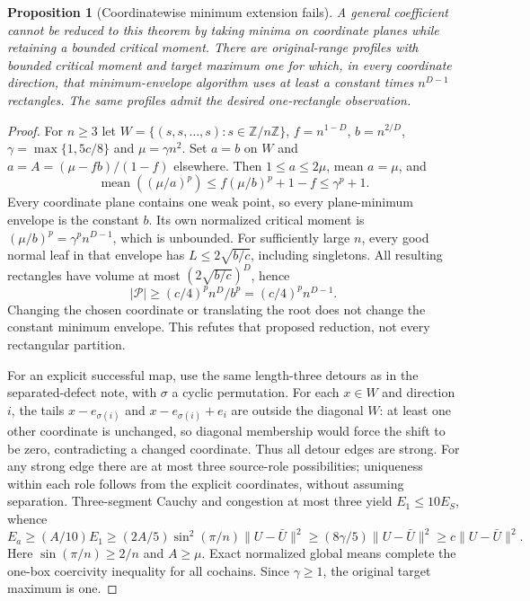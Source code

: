 \documentclass[11pt]{article}
\newtheorem{proposition}{Proposition}
\begin{document}
\begin{proposition}[Coordinatewise minimum extension fails]\label{prop:min}
A general coefficient cannot be reduced to this theorem by taking minima on coordinate planes while retaining a bounded critical moment. There are original-range profiles with bounded critical moment and target maximum one for which, in every coordinate direction, that minimum-envelope algorithm uses at least a constant times $n^{D-1}$ rectangles. The same profiles admit the desired one-rectangle observation.
\end{proposition}
\begin{proof}
For $n\ge3$ let $W=\{(s,s,\ldots,s):s\in\mathbb Z/n\mathbb Z\}$, $f=n^{1-D}$, $b=n^{2/D}$, $\gamma=\max\{1,5c/8\}$ and $\mu=\gamma n^2$. Set $a=b$ on $W$ and $a=A=(\mu-fb)/(1-f)$ elsewhere. Then $1\le a\le2\mu$, mean $a=\mu$, and
\[
 \operatorname{mean}((\mu/a)^p)\le f(\mu/b)^p+1-f\le\gamma^p+1.
\]
Every coordinate plane contains one weak point, so every plane-minimum envelope is the constant $b$. Its own normalized critical moment is $(\mu/b)^p=\gamma^p n^{D-1}$, which is unbounded. For sufficiently large $n$, every good normal leaf in that envelope has $L\le2\sqrt{b/c}$, including singletons. All resulting rectangles have volume at most $(2\sqrt{b/c})^D$, hence
\[
 |\mathcal P|\ge(c/4)^p n^D/b^p=(c/4)^p n^{D-1}.
\]
Changing the chosen coordinate or translating the root does not change the constant minimum envelope. This refutes that proposed reduction, not every rectangular partition.

For an explicit successful map, use the same length-three detours as in the separated-defect note, with $\sigma$ a cyclic permutation. For each $x\in W$ and direction $i$, the tails $x-e_{\sigma(i)}$ and $x-e_{\sigma(i)}+e_i$ are outside the diagonal $W$: at least one other coordinate is unchanged, so diagonal membership would force the shift to be zero, contradicting a changed coordinate. Thus all detour edges are strong. For any strong edge there are at most three source-role possibilities; uniqueness within each role follows from the explicit coordinates, without assuming separation. Three-segment Cauchy and congestion at most three yield $E_1\le10E_S$, whence
\[
 E_a\ge(A/10)E_1\ge (2A/5)\sin^2(\pi/n)\|U-\bar U\|^2
 \ge (8\gamma/5)\|U-\bar U\|^2\ge c\|U-\bar U\|^2.
\]
Here $\sin(\pi/n)\ge2/n$ and $A\ge\mu$. Exact normalized global means complete the one-box coercivity inequality for all cochains. Since $\gamma\ge1$, the original target maximum is one.
\end{proof}
\end{document}
